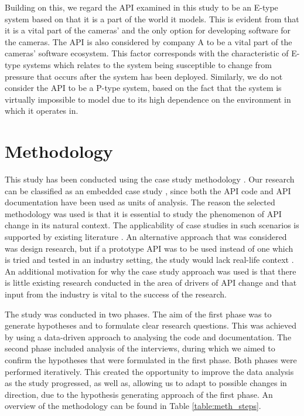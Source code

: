 \documentclass{sig-alternate}
\begin{document}
Building on this, we regard the API examined in this study to be an E-type system based on that it is a part of the world it models. This is evident from that it is a vital part of the cameras' and the only option for developing software for the cameras. The API is also considered by company A to be a vital part of the cameras' software ecosystem. This factor corresponds with the characteristic of E-type systems which relates to the system being susceptible to change from pressure that occurs after the system has been deployed. Similarly, we do not consider the API to be a P-type system, based on the fact that the system is virtually impossible to model due to its high dependence on the environment in which it operates in.



\section{Methodology} \label{methodology}
This study has been conducted using the case study methodology \cite{runeson2009guidelines}. Our research can be classified as an embedded case study \cite{yin2013case}, since both the API code and API documentation have been used as units of analysis. The reason the selected methodology was used is that it is essential to study the phenomenon of API change in its natural context. The applicability of case studies in such scenarios is supported by existing literature \cite{benbasat1987case, robson2002real, runeson2009guidelines, yin2013case}. An alternative approach that was considered was design research, but if a prototype API was to be used instead of one which is tried and tested in an industry setting, the study would lack real-life context \cite{runeson2009guidelines}. An additional motivation for why the case study approach was used is that there is little existing research conducted in the area of drivers of API change and that input from the industry is vital to the success of the research. 

\newpage

The study was conducted in two phases. The aim of the first phase was to generate hypotheses and to formulate clear research questions. This was achieved by using a data-driven approach to analysing the code and documentation. The second phase included analysis of the interviews, during which we aimed to confirm the hypotheses that were formulated in the first phase. Both phases were performed iteratively. This created the opportunity to improve the data analysis as the study progressed, as well as, allowing us to adapt to possible changes in direction, due to the hypothesis generating approach of the first phase. An overview of the methodology can be found in Table \ref{table:meth_steps}.
\end{document}
